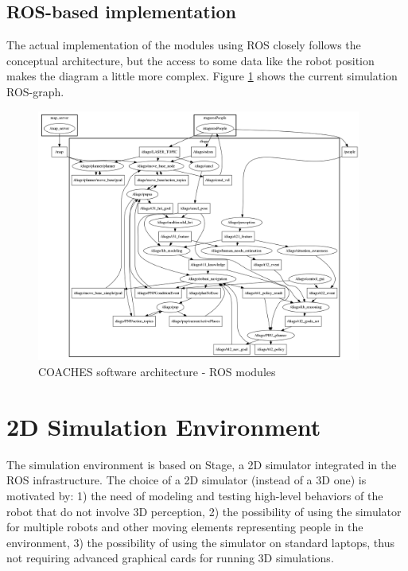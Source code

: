 \documentclass{article}
\begin{document}
\subsection {ROS-based implementation}

The actual implementation of the modules using ROS closely follows the conceptual architecture, but the access to some data like the robot position makes the diagram a little more complex. Figure \ref{fig:archi} shows the current simulation ROS-graph.

\begin{figure}
\includegraphics[width=0.95\textwidth]{noname.png}
\caption{COACHES software architecture - ROS modules}
\label{fig:archi}
\end{figure}

\section{2D Simulation Environment}

The simulation environment is based on Stage, a 2D simulator integrated in the ROS infrastructure. The choice of a 2D simulator (instead of a 3D one) is motivated by: 1) the need of modeling and testing high-level behaviors of the robot that do not involve 3D perception, 2) the possibility of using the simulator for multiple robots and other moving elements representing people in the environment, 3) the possibility of using the simulator on standard laptops, thus not requiring advanced graphical cards for running 3D simulations.
\end{document}
